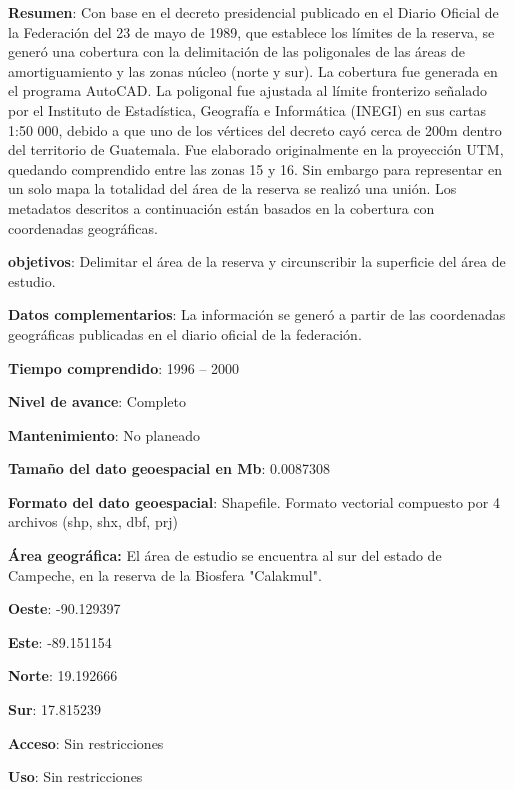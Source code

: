 \documentclass[twoside]{book}
\begin{document}
\textbf{Resumen}: Con base en el decreto presidencial publicado en el Diario Oficial de la Federación del 23 de mayo de 1989, que establece los límites de la reserva, se generó una cobertura con la delimitación de las poligonales de las áreas de amortiguamiento y las zonas núcleo (norte y sur). La cobertura fue generada en el programa AutoCAD. La poligonal fue ajustada al límite fronterizo señalado por el Instituto de Estadística, Geografía e Informática (INEGI) en sus cartas 1:50 000, debido a que uno de los vértices del decreto cayó cerca de 200m dentro del territorio de Guatemala. Fue elaborado originalmente en la proyección UTM, quedando comprendido entre las zonas 15 y 16. Sin embargo para representar en un solo mapa la totalidad del área de la reserva se realizó una unión. Los metadatos descritos a continuación están basados en la cobertura con coordenadas geográficas.

\textbf{objetivos}: Delimitar el área de la reserva y circunscribir la superficie del área de estudio.

\textbf{Datos complementarios}: La información se generó a partir de las coordenadas geográficas publicadas en el diario oficial de la federación.

\textbf{Tiempo comprendido}: 1996 – 2000

\textbf{Nivel de avance}: Completo

\textbf{Mantenimiento}: No planeado

\textbf{Tamaño del dato geoespacial en Mb}: 0.0087308

\textbf{Formato del dato geoespacial}: Shapefile. Formato vectorial compuesto por 4 archivos (shp, shx, dbf, prj)

\textbf{Área geográfica:} El área de estudio se encuentra al sur del estado de Campeche, en la reserva de la Biosfera "Calakmul".


\textbf{Oeste}: -90.129397

\textbf{Este}: -89.151154

\textbf{Norte}: 19.192666

\textbf{Sur}: 17.815239


\textbf{Acceso}: Sin restricciones

\textbf{Uso}: Sin restricciones
\end{document}
